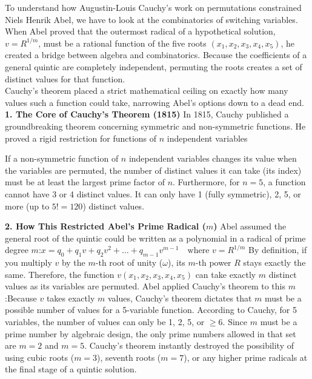  To understand how Augustin-Louis Cauchy's work on permutations constrained Niels Henrik Abel, 
 we have to look at the combinatorics of switching variables.\\
 When Abel proved that the outermost radical of a hypothetical solution, \(v = R^{1/m}\), must be a rational function of the five roots \((x_1, x_2, x_3, x_4, x_5)\), 
 he created a bridge between algebra and combinatorics. 
 Because the coefficients of a general quintic are completely independent, permuting the roots creates a set of distinct values for that function.\\
 Cauchy's theorem placed a strict mathematical ceiling on exactly how many values such a function could take, narrowing Abel's options down to a dead end.\\

{\bf  1. The Core of Cauchy's Theorem (1815)}
In 1815, Cauchy published a groundbreaking theorem concerning symmetric and non-symmetric functions. 
He proved a rigid restriction for functions of \(n\) independent variables
\begin{theorem}
If a non-symmetric function of \(n\) independent variables changes its value when the variables are permuted, the number of distinct values it can take (its index) must be at least the largest prime factor of \(n\). Furthermore, for \(n = 5\), a function cannot have 3 or 4 distinct values. 
It can only have 1 (fully symmetric), 2, 5, or more (up to \(5! = 120\)) distinct values.
\end{theorem}

{\bf 2. How This Restricted Abel's Prime Radical (\(m\))}
Abel assumed the general root of the quintic could be written as a polynomial in a radical of prime degree 
\(m\):\(x=q_{0}+q_{1}v+q_{2}v^{2}+\dots +q_{m-1}v^{m-1}\quad \text{where\ }v=R^{1/m}\)
By definition, if you multiply \(v\) by the \(m\)-th root of unity (\(\omega \)), its \(m\)-th power \(R\) stays exactly the same. 
Therefore, the function \(v(x_1, x_2, x_3, x_4, x_5)\) can take exactly \(m\) distinct values as its variables are permuted.
Abel applied Cauchy's theorem to this \(m\):Because \(v\) takes exactly \(m\) values, 
Cauchy's theorem dictates that \(m\) must be a possible number of values for a 5-variable function.
According to Cauchy, for 5 variables, the number of values can only be 1, 2, 5, or \(\ge 6\).
Since \(m\) must be a prime number by algebraic design, the only prime numbers allowed in that set are \(m = 2\) and \(m = 5\).
Cauchy's theorem instantly destroyed the possibility of using cubic roots (\(m=3\)), seventh roots (\(m=7\)), or any higher prime radicals at the final stage of a quintic solution.\\

